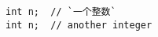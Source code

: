 \documentclass[nofonts]{ctexart}
\begin{document}
\lstset{ %
        language = C,
        flexiblecolumns,
        escapechar =`
}
\begin{lstlisting}
int n;  // `一个整数`
int n;  // another integer
\end{lstlisting}
\end{document}
